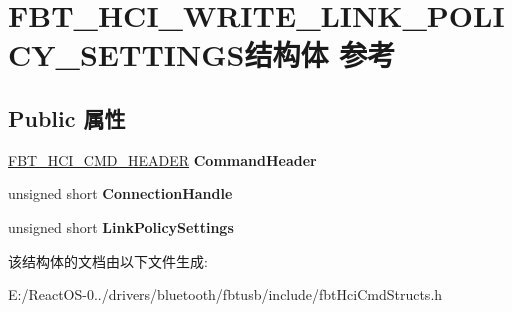 \hypertarget{struct_f_b_t___h_c_i___w_r_i_t_e___l_i_n_k___p_o_l_i_c_y___s_e_t_t_i_n_g_s}{}\section{F\+B\+T\+\_\+\+H\+C\+I\+\_\+\+W\+R\+I\+T\+E\+\_\+\+L\+I\+N\+K\+\_\+\+P\+O\+L\+I\+C\+Y\+\_\+\+S\+E\+T\+T\+I\+N\+G\+S结构体 参考}
\label{struct_f_b_t___h_c_i___w_r_i_t_e___l_i_n_k___p_o_l_i_c_y___s_e_t_t_i_n_g_s}
\subsection*{Public 属性}
\begin{DoxyCompactItemize}
\item 
\mbox{\label{struct_f_b_t___h_c_i___w_r_i_t_e___l_i_n_k___p_o_l_i_c_y___s_e_t_t_i_n_g_s_a9e605de24cb74951154f5c438c25af2c}} 
\hyperlink{struct_f_b_t___h_c_i___c_m_d___h_e_a_d_e_r}{F\+B\+T\+\_\+\+H\+C\+I\+\_\+\+C\+M\+D\+\_\+\+H\+E\+A\+D\+ER} {\bfseries Command\+Header}
\item 
\mbox{\label{struct_f_b_t___h_c_i___w_r_i_t_e___l_i_n_k___p_o_l_i_c_y___s_e_t_t_i_n_g_s_a28410e88b397846e4f2300709b2c92d4}} 
unsigned short {\bfseries Connection\+Handle}
\item 
\mbox{\label{struct_f_b_t___h_c_i___w_r_i_t_e___l_i_n_k___p_o_l_i_c_y___s_e_t_t_i_n_g_s_a70d4558e1194f48a15b7866b6a0e7639}} 
unsigned short {\bfseries Link\+Policy\+Settings}
\end{DoxyCompactItemize}


该结构体的文档由以下文件生成\+:\begin{DoxyCompactItemize}
\item 
E\+:/\+React\+O\+S-\/0../drivers/bluetooth/fbtusb/include/fbt\+Hci\+Cmd\+Structs.\+h\end{DoxyCompactItemize}
